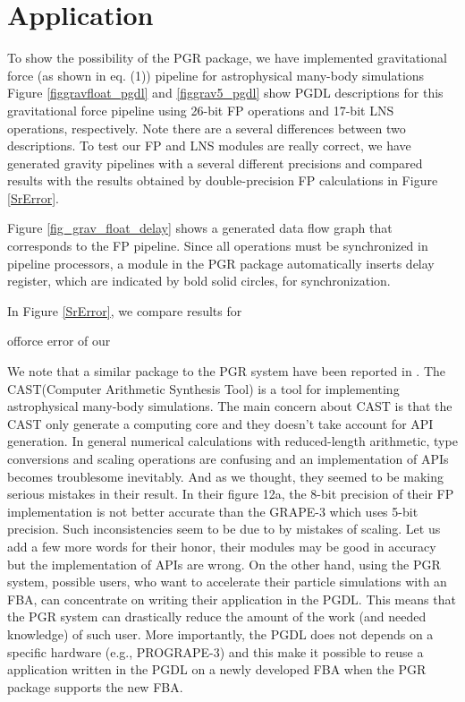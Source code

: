 \documentclass{llncs}
\begin{document}
\section{Application}
To show the possibility of the PGR package, we have implemented gravitational
force (as shown in eq. (1)) pipeline for astrophysical many-body simulations
Figure \ref{figgravfloat_pgdl} and \ref{figgrav5_pgdl}
show PGDL descriptions for this gravitational force pipeline
using 26-bit FP operations and 17-bit LNS operations, respectively.
Note there are a several differences between two descriptions.
To test our FP and LNS modules are really correct, 
we have generated gravity pipelines with a several different precisions
and compared results with the results obtained by double-precision FP
calculations in Figure \ref{SrError}.




Figure \ref{fig_grav_float_delay} shows a generated 
data flow graph that corresponds to the FP pipeline.
Since all operations must be synchronized in pipeline processors, 
a module in the PGR package automatically inserts
delay register, which are indicated by bold solid circles,
for synchronization.

In Figure \ref{SrError}, we compare results for

offorce error of our 


We note that a similar package to the PGR system have been reported in \cite{THYL04}.
The CAST(Computer Arithmetic Synthesis Tool) is a tool
for implementing astrophysical many-body simulations.
The main concern about CAST is that the CAST only generate
a computing core and they doesn't take account for API generation. 
In general numerical calculations with reduced-length arithmetic, 
type conversions and scaling operations are confusing and
an implementation of APIs becomes troublesome inevitably.
And as we thought, they seemed to be making serious mistakes in their result.
In their figure 12a, the 8-bit precision of their FP
implementation is not better accurate than the GRAPE-3 which uses 5-bit precision.
Such inconsistencies seem to be due to by mistakes of scaling.
Let us add a few more words for their honor, their modules may be good
in accuracy but the implementation of APIs are wrong. 
On the other hand, using the PGR system, possible users, 
who want to accelerate their particle simulations with an FBA,
can concentrate on writing their application in the PGDL.
This means that the PGR system can drastically reduce the amount of
the work (and needed knowledge) of such user.
More importantly, the PGDL does not depends on a specific hardware
(e.g., PROGRAPE-3) and this make it possible to
reuse a application written in the PGDL on a newly developed FBA
when the PGR package supports the new FBA.
\end{document}
